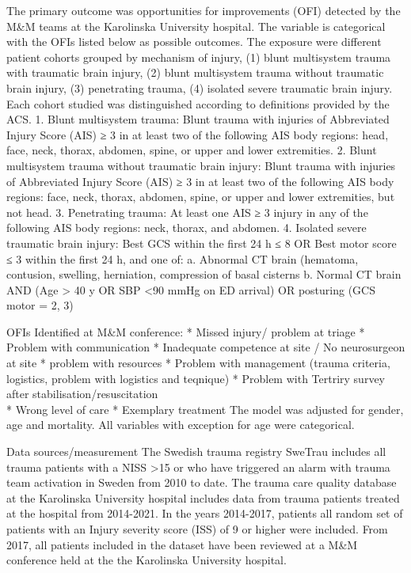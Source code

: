 \documentclass[
]{article}
\begin{document}
The primary outcome was opportunities for improvements (OFI) detected by
the M\&M teams at the Karolinska University hospital. The variable is
categorical with the OFIs listed below as possible outcomes. The
exposure were different patient cohorts grouped by mechanism of injury,
(1) blunt multisystem trauma with traumatic brain injury, (2) blunt
multisystem trauma without traumatic brain injury, (3) penetrating
trauma, (4) isolated severe traumatic brain injury. Each cohort studied
was distinguished according to definitions provided by the ACS. 1. Blunt
multisystem trauma: Blunt trauma with injuries of Abbreviated Injury
Score (AIS) ≥ 3 in at least two of the following AIS body regions: head,
face, neck, thorax, abdomen, spine, or upper and lower extremities. 2.
Blunt multisystem trauma without traumatic brain injury: Blunt trauma
with injuries of Abbreviated Injury Score (AIS) ≥ 3 in at least two of
the following AIS body regions: face, neck, thorax, abdomen, spine, or
upper and lower extremities, but not head. 3. Penetrating trauma: At
least one AIS ≥ 3 injury in any of the following AIS body regions: neck,
thorax, and abdomen. 4. Isolated severe traumatic brain injury: Best GCS
within the first 24 h ≤ 8 OR Best motor score ≤ 3 within the first 24 h,
and one of: a. Abnormal CT brain (hematoma, contusion, swelling,
herniation, compression of basal cisterns b. Normal CT brain AND (Age
\textgreater{} 40 y OR SBP \textless90 mmHg on ED arrival) OR posturing
(GCS motor = 2, 3)

OFIs Identified at M\&M conference: * Missed injury/ problem at triage *
Problem with communication * Inadequate competence at site / No
neurosurgeon at site * problem with resources * Problem with management
(trauma criteria, logistics, problem with logistics and teqnique) *
Problem with Tertriry survey after stabilisation/resuscitation\\
* Wrong level of care * Exemplary treatment The model was adjusted for
gender, age and mortality. All variables with exception for age were
categorical.

Data sources/measurement The Swedish trauma registry SweTrau includes
all trauma patients with a NISS \textgreater15 or who have triggered an
alarm with trauma team activation in Sweden from 2010 to date. The
trauma care quality database at the Karolinska University hospital
includes data from trauma patients treated at the hospital from
2014-2021. In the years 2014-2017, patients all random set of patients
with an Injury severity score (ISS) of 9 or higher were included. From
2017, all patients included in the dataset have been reviewed at a M\&M
conference held at the the Karolinska University hospital.
\end{document}
